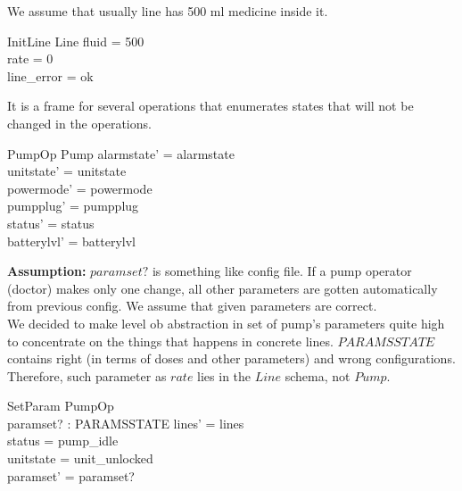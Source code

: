 \documentclass{article}
\begin{document}
	We assume that usually line has 500 ml medicine inside it.
	\begin{schema}{InitLine}
		Line
		\where
		fluid = 500 \\
		rate = 0 \\
		line\_error = ok \\
	\end{schema}

	It is a frame for several operations that enumerates states that will not be changed in the operations.
	\begin{schema}{PumpOp}
		\Delta Pump
	\where
    	alarmstate' = alarmstate \\
    	unitstate' = unitstate \\
    	powermode' = powermode \\
    	pumpplug' = pumpplug\\
    	status' = status \\
    	batterylvl' = batterylvl
    \end{schema}
	


	\textbf{Assumption:}  $paramset?$ is something like config file. If a pump operator (doctor) makes only one change, all other parameters are gotten automatically from previous config. We assume that given parameters are correct.\\
	We decided to make level ob abstraction in set of pump's parameters quite high to concentrate on the things that happens in concrete lines. $PARAMSSTATE$ contains right (in terms of doses and other parameters) and wrong configurations. Therefore, such parameter as $rate$ lies in the $Line$ schema, not $Pump$.
	\begin{schema}{SetParam}
		PumpOp \\
		paramset? : PARAMSSTATE 
	\where
	    lines' = lines  \\
		status = pump\_idle \\ 
		unitstate = unit\_unlocked \\
		paramset' = paramset?
	\end{schema}
\end{document}
